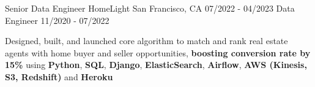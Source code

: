 

\begin{cventries}

\cventryupdate
    {Senior Data Engineer} %
    {HomeLight} %
    {San Francisco, CA} %
    {07/2022 - 04/2023} %
    {Data Engineer} %
    {11/2020 - 07/2022} %
    {
      \begin{cvitems} %
        \item{Designed, built, and launched core algorithm to match and rank real estate agents with home buyer and seller opportunities, \textbf{boosting conversion rate by 15\%} using \textbf{Python}, \textbf{SQL}, \textbf{Django}, \textbf{ElasticSearch}, \textbf{Airflow}, \textbf{AWS (Kinesis, S3, Redshift)} and \textbf{Heroku}}

\end{cvitems}}
\end{cventries}
